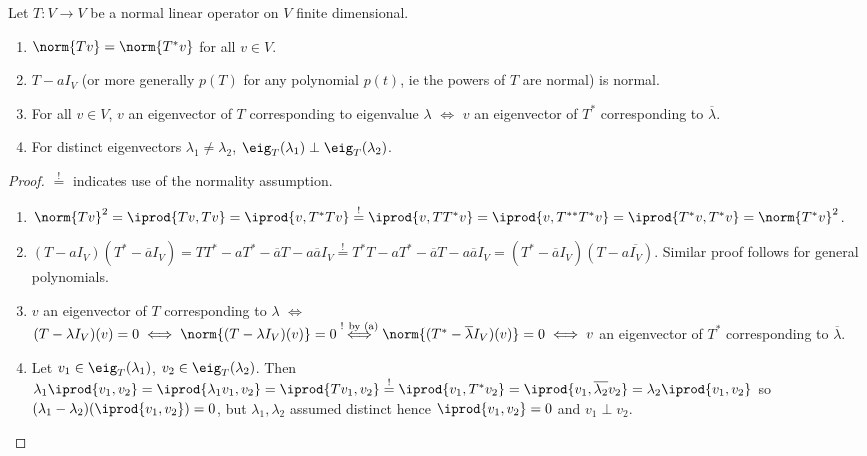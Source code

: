 \begin{proposition}
    Let $T : V \to V$ be a normal linear operator on $V$ finite dimensional. \begin{enumerate}[label=(\alph*)]
        \item $\norm{Tv} = \norm{T^\ast v}$ for all $v \in V$.
        \item $T - a I_V$ (or more generally $p(T)$ for any polynomial $p(t)$, ie the powers of $T$ are normal) is normal.
        \item For all $v \in V$, $v$ an eigenvector of $T$ corresponding to eigenvalue $\lambda$ $\iff$ $v$ an eigenvector of $T^\ast$ corresponding to $\overline{\lambda}$.
        \item For distinct eigenvectors $\lambda_1 \neq \lambda_2$, $\eig_T(\lambda_1) \perp \eig_T(\lambda_2)$.
    \end{enumerate}
\end{proposition}

\begin{proof}
    $\overset{!}{=}$ indicates use of the normality assumption.
    \begin{enumerate}[label=(\alph*)]
        \item $\norm{Tv}^2 = \iprod{Tv, Tv} = \iprod{v, T^\ast T v} \overset{!}{=} \iprod{v, T T^\ast v} = \iprod{v, T^{\ast \ast} T^{\ast} v} = \iprod{T^\ast v, T^\ast v} = \norm{T^\ast v}^2$.
        \item $(T - aI_V)(T^\ast - \overline{a} I_V) = T T^\ast - a T^\ast - \overline{a} T - a \overline{a}I_V \overset{!}{=} T^\ast T - aT^\ast - \overline{a}T - a \overline{a} I_V = (T^\ast - \overline{a} I_V)(T - a \overline{I_V})$. Similar proof follows for general polynomials.
        \item $v$ an eigenvector of $T$ corresponding to $\lambda$ $\iff$ $(T - \lambda I_V)(v) = 0 \iff \norm{(T-\lambda I_V)(v)} = 0 \overset{\text{! by (a)}}{\iff} \norm{(T^\ast - \overline{\lambda} I_V)(v)} =0 \iff v$ an eigenvector of $T^\ast$ corresponding to $\overline{\lambda}$.
        \item Let $v_1 \in \eig_T(\lambda_1)$, $v_2 \in \eig_T(\lambda_2)$. Then $\lambda_1 \iprod{v_1, v_2} = \iprod{\lambda_1 v_1, v_2} = \iprod{Tv_1, v_2} \overset{!}{=} \iprod{v_1, T^\ast v_2} = \iprod{v_1, \overline{\lambda_2} v_2} = \lambda_2 \iprod{v_1, v_2}$ so $(\lambda_1 - \lambda_2)(\iprod{v_1, v_2}) = 0$, but $\lambda_1, \lambda_2$ assumed distinct hence $\iprod{v_1, v_2} = 0$ and $v_1 \perp v_2$.
    \end{enumerate}
\end{proof}